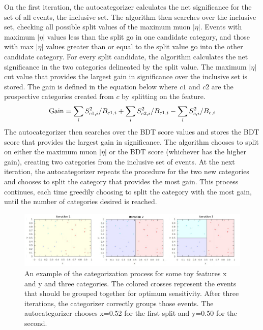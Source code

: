 On the first iteration, the autocategorizer calculates the net significance for the set of all events, the inclusive set.
The algorithm then searches over the inclusive set, checking all possible split values of the maximum muon $|\eta|$. Events
with maximum $|\eta|$ values less than the split go in one candidate category, and those with max $|\eta|$ values greater than or equal
to the split value go into the other candidate category. For every split candidate, the algorithm calculates the net significance
in the two categories delineated by the split value. The maximum $|\eta|$ cut value that provides the largest gain in significance
over the inclusive set is stored. The gain is defined in the equation below where $c1$ and $c2$ are the prospective categories
created from $c$ by splitting on the feature.
\begin{equation}
{\rm Gain} = \sum_{i}S_{c1,i}^{2}/B_{c1,i} + \sum_{i}S_{c2,i}^{2}/B_{c1,i} - \sum_{i}S_{c,i}^{2}/B_{c,i} 
\end{equation}
The autocategorizer then searches over the BDT score values and stores the BDT score that provides the largest gain in significance.
The algorithm chooses to split on either the maximum muon $|\eta|$ or the BDT score (whichever has the higher gain), creating two
categories from the inclusive set of events. At the next iteration, the autocategorizer repeats the procedure for the two new
categories and chooses to split the category that provides the most gain. This process continues, each time greedily choosing to
split the category with the most gain, until the number of categories desired is reached.


\begin{figure}[h!]
  \centering
  \includegraphics[width=0.98\linewidth]{images/bdt_cats/iter_all.png}
  \caption[An example of the autocategorization process.]
  {An example of the categorization process for some toy features x and y and three categories. The colored crosses represent the events that should be grouped together for optimum sensitivity. After three iterations, the categorizer correctly groups those events. The autocategorizer chooses x=0.52 for the first split and y=0.50 for the second.}
  \label{fig:iter_example}
\end{figure}

